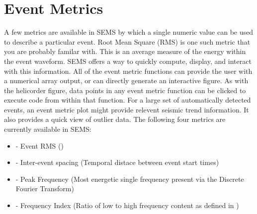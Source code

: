 \documentclass[11pt]{article}
\begin{document}
\section{Event Metrics}
A few metrics are available in SEMS by which a single numeric value can be used to describe a particular event. Root Mean Square (RMS) is one such metric that you are probably familar with. This is an average measure of the energy within the event waveform. SEMS offers a way to quickly compute, display, and interact with this information. All of the event metric functions can provide the user with a numerical array output, or can directly generate an interactive figure. As with the helicorder figure, data points in any event metric function can be clicked to execute code from within that function. For a large set of automatically detected events, an event metric plot might provide relevent seismic trend information. It also provides a quick view of outlier data. The following four metrics are currently available in SEMS:
\begin{itemize}
\item {} - Event RMS ()\\
\item {} - Inter-event spacing (Temporal distace between event start times)\\
\item {} - Peak Frequency (Most energetic single frequency present via the Discrete Fourier Transform)\\ 
\item {} - Frequency Index (Ratio of low to high frequency content as defined in \cite{buurman-west-2010})
\end{itemize}

\clearpage

{}


\end{document}
